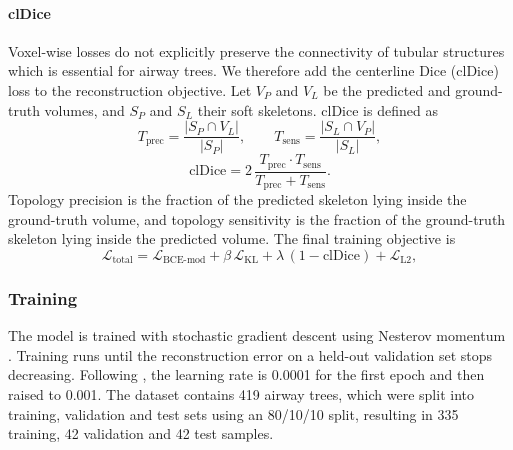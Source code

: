 \paragraph{clDice}       %
Voxel-wise losses do not explicitly preserve the connectivity of tubular structures which is
essential for airway trees. We therefore add the centerline Dice (clDice)
loss \cite{shit2021} to the reconstruction objective. Let $V_P$ and $V_L$ be the predicted
and ground-truth volumes, and $S_P$ and $S_L$ their soft skeletons. clDice is defined as
\begin{equation}
  T_{\mathrm{prec}} = \frac{|S_P \cap V_L|}{|S_P|}, \qquad
  T_{\mathrm{sens}} = \frac{|S_L \cap V_P|}{|S_L|},
  \label{eq:tprec_tsens}                 %
\end{equation}
\begin{equation}
  \mathrm{clDice} = 2\,\frac{T_{\mathrm{prec}} \cdot T_{\mathrm{sens}}}
                             {T_{\mathrm{prec}} + T_{\mathrm{sens}}}.
  \label{eq:cldice}                      %
\end{equation}
Topology precision is the fraction of the predicted skeleton lying inside the ground-truth
volume, and topology sensitivity is the fraction of the ground-truth skeleton lying inside
the predicted volume. The final training objective is
\begin{equation}
  \mathcal{L}_{\mathrm{total}} = \mathcal{L}_{\mathrm{BCE\text{-}mod}}
  + \beta\,\mathcal{L}_{\mathrm{KL}}
  + \lambda\,(1 - \mathrm{clDice})
  + \mathcal{L}_{\mathrm{L2}},
  \label{eq:total_loss}                  %
\end{equation}


\subsubsection{Training}                 %
\label{sec:vae_training}                 %

The model is trained with stochastic gradient descent using Nesterov momentum \cite{sutskever2013}. 
Training runs until the reconstruction error on a held-out validation set stops decreasing.
 Following \citet{brock2016}, the learning rate is 0.0001 for the first epoch and then raised 
 to 0.001. The dataset contains 419 airway trees, which were split into training, validation and test sets using an 80/10/10 split, 
 resulting in 335 training, 42 validation and 42 test samples. 


